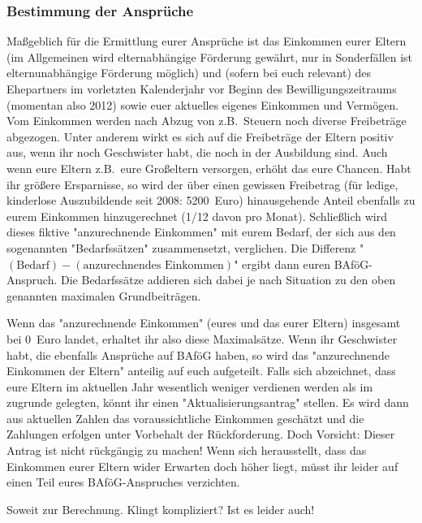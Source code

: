 \begin{multicols*}{2}
\subsubsection*{Bestimmung der Ansprüche}
Maßgeblich für die Ermittlung eurer Ansprüche ist das Einkommen eurer Eltern (im Allgemeinen wird elternabhängige Förderung gewährt, nur in Sonderfällen ist elternunabhängige Förderung möglich) und (sofern bei euch relevant) des Ehepartners im vorletzten Kalenderjahr vor Beginn des Bewilligungszeitraums (momentan also 2012) sowie euer aktuelles eigenes Einkommen und Vermögen. Vom Einkommen werden nach Abzug von z.B.\ Steuern noch diverse Freibeträge abgezogen. Unter anderem wirkt es sich auf die Freibeträge der Eltern positiv aus, wenn ihr noch Geschwister habt, die noch in der Ausbildung sind. Auch wenn eure Eltern z.B.\ eure Großeltern versorgen, erhöht das eure Chancen. Habt ihr größere Ersparnisse, so wird der über einen gewissen Freibetrag (für ledige, kinderlose Auszubildende seit 2008: \num{5200}~Euro) hinausgehende Anteil ebenfalls zu eurem Einkommen hinzugerechnet (\num{1/12} davon pro Monat). Schließlich wird dieses fiktive "anzurechnende Einkommen" mit eurem Bedarf, der sich aus den sogenannten "Bedarfssätzen" zusammensetzt, verglichen. Die Differenz "$(\text{Bedarf}) - (\text{anzurechnendes Einkommen})$" ergibt dann euren BAföG-Anspruch. Die Bedarfssätze addieren sich dabei je nach Situation zu den oben genannten maximalen Grundbeiträgen.

Wenn das "anzurechnende Einkommen" (eures und das eurer Eltern) insgesamt bei 0~Euro landet, erhaltet ihr also diese Maximalsätze. Wenn ihr Geschwister habt, die ebenfalls Ansprüche auf BAföG haben, so wird das "anzurechnende Einkommen der Eltern" anteilig auf euch aufgeteilt. Falls sich abzeichnet, dass eure Eltern im aktuellen Jahr wesentlich weniger verdienen werden als im zugrunde gelegten, könnt ihr einen "Aktualisierungsantrag" stellen. Es wird dann aus aktuellen Zahlen das voraussichtliche Einkommen geschätzt und die Zahlungen erfolgen unter Vorbehalt der Rückforderung. Doch Vorsicht: Dieser Antrag ist nicht rückgängig zu machen! Wenn sich herausstellt, dass das Einkommen eurer Eltern wider Erwarten doch höher liegt, müsst ihr leider auf einen Teil eures BAföG-Anspruches verzichten.

Soweit zur Berechnung. Klingt kompliziert? Ist es leider auch!


\end{multicols*}
